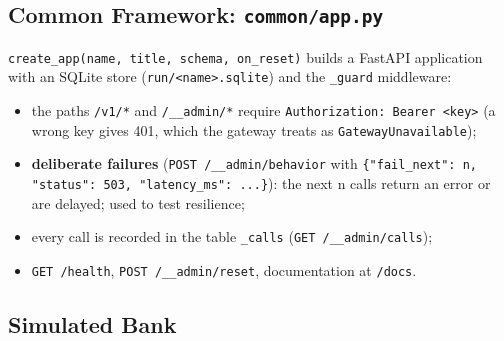 \hypertarget{common-framework-commonapp.py}{%
\subsection{\texorpdfstring{Common Framework:
\texttt{common/\allowbreak{}app.\allowbreak{}py}}{Common Framework: common/app.py}}\label{common-framework-commonapp.py}}

\texttt{create\_\allowbreak{}app(\allowbreak{}name,\allowbreak{} title,\allowbreak{} schema,\allowbreak{} on\_\allowbreak{}reset)} builds a FastAPI
application with an SQLite store
(\texttt{run/\allowbreak{}\textless{}name\textgreater{}\allowbreak{}.\allowbreak{}sqlite}) and the
\texttt{\_\allowbreak{}guard} middleware:

\begin{itemize}
\tightlist
\item
  the paths \texttt{/\allowbreak{}v1/\allowbreak{}*} and \texttt{/\allowbreak{}\_\allowbreak{}\_\allowbreak{}admin/\allowbreak{}*} require
  \texttt{Authorization: Bearer \textless{}key\textgreater{}\allowbreak{}} (a wrong
  key gives 401, which the gateway treats as
  \texttt{GatewayUnavailable});
\item
  \textbf{deliberate failures} (\texttt{POST /\allowbreak{}\_\allowbreak{}\_\allowbreak{}admin/\allowbreak{}behavior} with
  \texttt{\{"fail\_\allowbreak{}next": n,\allowbreak{} "status": 503,\allowbreak{} "latency\_\allowbreak{}ms": .\allowbreak{}.\allowbreak{}.\allowbreak{}\}}):
  the next n calls return an error or are delayed; used to test
  resilience;
\item
  every call is recorded in the table \texttt{\_\allowbreak{}calls}
  (\texttt{GET /\allowbreak{}\_\allowbreak{}\_\allowbreak{}admin/\allowbreak{}calls});
\item
  \texttt{GET /\allowbreak{}health}, \texttt{POST /\allowbreak{}\_\allowbreak{}\_\allowbreak{}admin/\allowbreak{}reset}, documentation
  at \texttt{/\allowbreak{}docs}.
\end{itemize}

\hypertarget{simulated-bank}{%
\subsection{Simulated Bank}\label{simulated-bank}}

